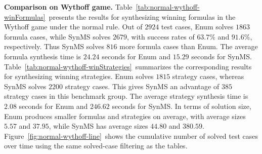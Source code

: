 \documentclass[review]{elsarticle}
\begin{document}
\textbf{Comparison on Wythoff game.}
Table~\ref{tab:normal-wythoff-winFormulas}~presents the results for synthesizing winning formulas in the Wythoff game under the normal rule.
Out of $2924$ test cases, Enum solves $1863$ formula cases, while SynMS solves $2679$, with success rates of $63.7\%$ and $91.6\%$, respectively.
Thus SynMS solves $816$ more formula cases than Enum.
The average formula synthesis time is $24.24$ seconds for Enum and $15.29$ seconds for SynMS.
Table~\ref{tab:normal-wythoff-winStrategies}~summarizes the corresponding results for synthesizing winning strategies.
Enum solves $1815$ strategy cases, whereas SynMS solves $2200$ strategy cases.
This gives SynMS an advantage of $385$ strategy cases in this benchmark group.
The average strategy synthesis time is $2.08$ seconds for Enum and $246.62$ seconds for SynMS.
In terms of solution size, Enum produces smaller formulas and strategies on average, with average sizes $5.57$ and $37.95$, while SynMS has average sizes $44.80$ and $380.59$.
Figure~\ref{fig:normal-wythoff-line}~shows the cumulative number of solved test cases over time using the same solved-case filtering as the tables.
\end{document}
